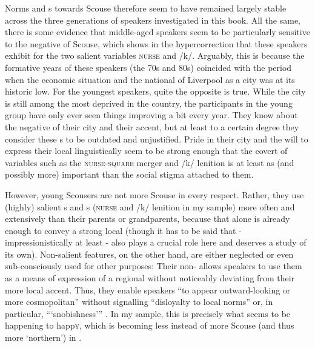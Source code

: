 Norms and s towards Scouse therefore seem to have remained largely stable across the three generations of speakers investigated in this book.
All the same, there is some evidence that middle-aged speakers seem to be particularly sensitive to the negative  of Scouse, which shows in the hypercorrection that these speakers exhibit for the two salient variables \textsc{nurse} and /k/.
Arguably, this is because the formative years of these speakers (the 70s and 80s) coincided with the period when the economic situation and the national  of Liverpool as a city was at its historic low.
For the youngest speakers, quite the opposite is true.
While the city is still among the most deprived in the country, the participants in the young group have only ever seen things improving a bit every year.
They know about the negative  of their city and their accent, but at least to a certain degree they consider these s to be outdated and unjustified.
Pride in their city and the will to express their local  linguistically seem to be strong enough that the covert  of variables such as the \textsc{nurse}-\textsc{square} merger and /k/ lenition is at least as (and possibly more) important than the social stigma attached to them.

However, young Scousers are not more Scouse in every respect.
Rather, they use (highly) salient s and s (\textsc{nurse} and /k/ lenition in my sample) more often and extensively than their parents or grandparents, because that alone is already enough to convey a strong local  (though it has to be said that  - impressionistically at least - also plays a crucial role here and deserves a study of its own).
Non-salient features, on the other hand, are either neglected or even sub-consciously used for other purposes: Their non- allows speakers to use them as a means of expression of a regional  without noticeably deviating from their more local accent.
Thus, they enable speakers ``to appear outward-looking or more cosmopolitan'' without signalling ``disloyalty to local norms'' or, in particular, ``{}`snobishness'{}'' \parencite[13--14]{foulkesdocherty1999a}.
In my sample, this is precisely what seems to be happening to happ\textsc{y}, which is becoming less instead of more Scouse (and thus more `northern') in .


